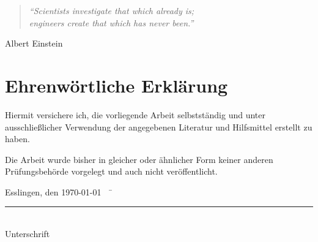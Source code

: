 \thispagestyle{empty}
\vspace*{2cm}
\begin{center}
    \begin{minipage}{12cm}
        \begin{center}
        \end{center}
    \end{minipage}

    \vfill{}

    \begin{minipage}{10cm}
        \begin{quote}
            \textit{``Scientists investigate that which already is;\\ engineers create that which has never been.''}
        \end{quote}
        \hfill Albert Einstein
    \end{minipage}
\end{center}

\chapter*{Ehrenwörtliche Erklärung}
\thispagestyle{empty}
Hiermit versichere ich, die vorliegende Arbeit selbstständig und unter ausschließlicher Verwendung der angegebenen
Literatur und Hilfsmittel erstellt zu haben.

Die Arbeit wurde bisher in gleicher oder ähnlicher Form keiner anderen Prüfungsbehörde vorgelegt und auch nicht
veröffentlicht.

\begin{tabbing}
          Esslingen, den \today ~~	\= \rule{6cm}{0.3mm}\\ \> Unterschrift
\end{tabbing}





\frontmatter

\tableofcontents


